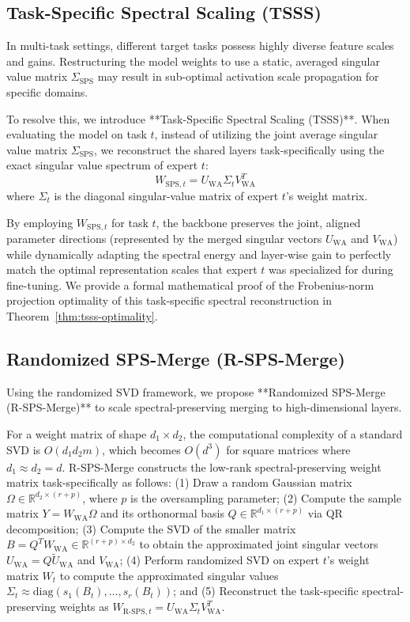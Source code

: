 \documentclass{article}
\theoremstyle{plain}
\theoremstyle{definition}
\theoremstyle{remark}
\begin{document}
\subsection{Task-Specific Spectral Scaling (TSSS)}
In multi-task settings, different target tasks possess highly diverse feature scales and gains. Restructuring the model weights to use a static, averaged singular value matrix $\Sigma_{\text{SPS}}$ may result in sub-optimal activation scale propagation for specific domains. 

To resolve this, we introduce **Task-Specific Spectral Scaling (TSSS)**. When evaluating the model on task $t$, instead of utilizing the joint average singular value matrix $\Sigma_{\text{SPS}}$, we reconstruct the shared layers task-specifically using the exact singular value spectrum of expert $t$:
\begin{equation}
    W_{\text{SPS}, t} = U_{\text{WA}} \Sigma_t V_{\text{WA}}^T
\end{equation}
where $\Sigma_t$ is the diagonal singular-value matrix of expert $t$'s weight matrix. 

By employing $W_{\text{SPS}, t}$ for task $t$, the backbone preserves the joint, aligned parameter directions (represented by the merged singular vectors $U_{\text{WA}}$ and $V_{\text{WA}}$) while dynamically adapting the spectral energy and layer-wise gain to perfectly match the optimal representation scales that expert $t$ was specialized for during fine-tuning. We provide a formal mathematical proof of the Frobenius-norm projection optimality of this task-specific spectral reconstruction in Theorem~\ref{thm:tsss-optimality}.

\subsection{Randomized SPS-Merge (R-SPS-Merge)}
Using the randomized SVD framework, we propose **Randomized SPS-Merge (R-SPS-Merge)** to scale spectral-preserving merging to high-dimensional layers. 

For a weight matrix of shape $d_1 \times d_2$, the computational complexity of a standard SVD is $O(d_1 d_2 m)$, which becomes $O(d^3)$ for square matrices where $d_1 \approx d_2 = d$. R-SPS-Merge constructs the low-rank spectral-preserving weight matrix task-specifically as follows: (1) Draw a random Gaussian matrix $\Omega \in \mathbb{R}^{d_2 \times (r+p)}$, where $p$ is the oversampling parameter; (2) Compute the sample matrix $Y = W_{\text{WA}} \Omega$ and its orthonormal basis $Q \in \mathbb{R}^{d_1 \times (r+p)}$ via QR decomposition; (3) Compute the SVD of the smaller matrix $B = Q^T W_{\text{WA}} \in \mathbb{R}^{(r+p) \times d_2}$ to obtain the approximated joint singular vectors $U_{\text{WA}} = Q \tilde{U}_{\text{WA}}$ and $V_{\text{WA}}$; (4) Perform randomized SVD on expert $t$'s weight matrix $W_t$ to compute the approximated singular values $\Sigma_t \approx \text{diag}(s_1(B_t), \dots, s_r(B_t))$; and (5) Reconstruct the task-specific spectral-preserving weights as $W_{\text{R-SPS}, t} = U_{\text{WA}} \Sigma_t V_{\text{WA}}^T$.
\end{document}
